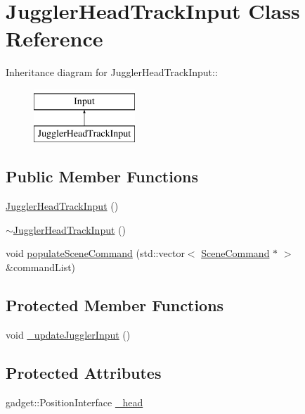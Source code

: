 \hypertarget{class_juggler_head_track_input}{
\section{JugglerHeadTrackInput Class Reference}
\label{class_juggler_head_track_input}
}
Inheritance diagram for JugglerHeadTrackInput::\begin{figure}[H]
\begin{center}
\leavevmode
\includegraphics[height=2cm]{class_juggler_head_track_input}
\end{center}
\end{figure}
\subsection*{Public Member Functions}
\begin{DoxyCompactItemize}
\item 
\hyperlink{class_juggler_head_track_input_a9465d45a5d3f226744992d6919a04c13}{JugglerHeadTrackInput} ()
\item 
\hyperlink{class_juggler_head_track_input_a6497d13fcfd34b341d009ffa942708af}{$\sim$JugglerHeadTrackInput} ()
\item 
void \hyperlink{class_juggler_head_track_input_abb40712fe1e84f4172e883645bd0f1b8}{populateSceneCommand} (std::vector$<$ \hyperlink{class_scene_command}{SceneCommand} $\ast$ $>$ \&commandList)
\end{DoxyCompactItemize}
\subsection*{Protected Member Functions}
\begin{DoxyCompactItemize}
\item 
void \hyperlink{class_juggler_head_track_input_a34f56d956372b53ad138b16965da1836}{\_\-updateJugglerInput} ()
\end{DoxyCompactItemize}
\subsection*{Protected Attributes}
\begin{DoxyCompactItemize}
\item 
gadget::PositionInterface \hyperlink{class_juggler_head_track_input_accbcc9cc4abeefa75a8c918484222386}{\_\-head}
\end{DoxyCompactItemize}


